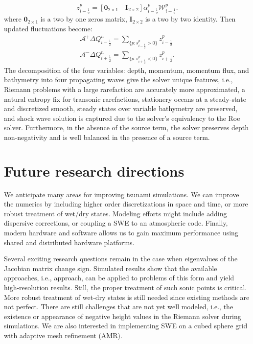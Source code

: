 \documentclass[10pt,a4paper]{article}
\begin{document}
	\begin{equation}
		z_{i-\frac{1}{2}}^{p} = [\mathbf{0}_{2\times1} \quad \mathbf{I}_{2\times2}] \alpha_{i-\frac{1}{2}}^{p} \mathcal{W}_{i-\frac{1}{2}}^{p}.
	\end{equation}
	where $\mathbf{0}_{2\times1}$ is a two by one zeros matrix, $\mathbf{I}_{2\times2}$ is a two by two identity. Then updated fluctuations become:
	\begin{eqnarray}
		\mathcal{A^{+}}\Delta Q_{i-\frac{1}{2}}^{n} = \sum_{\{ p:s_{i-\frac{1}{2}}^{p}>0\}}  z_{i-\frac{1}{2}}^{p}
		\label{p7}\\
		\mathcal{A^{-}}\Delta Q_{i+\frac{1}{2}}^{n} = \sum_{\{ p:s_{i+\frac{1}{2}}^{p}<0\}} z_{i+\frac{1}{2}}^{p}.
		\label{p8}
	\end{eqnarray}
The decomposition of the four variables: depth, momentum, momentum flux, and bathymetry into four propagating waves give the solver unique features, i.e.,  Riemann problems with a large rarefaction are accurately more approximated, a natural entropy fix for transonic rarefactions,  stationery oceans at a steady-state and discretized smooth, steady states over variable bathymetry are preserved, and shock wave solution is captured due to the solver's equivalency to the Roe solver.
	Furthermore, in the absence of the source term, the solver preserves depth non-negativity and is well balanced in the presence of a source term.  
	
	
	\section{ Future research directions}
	
	We anticipate many areas for improving tsunami simulations.  We can improve the numerics by including higher order discretizations in space and time, or more robust treatment of  wet/dry states. Modeling efforts might include adding dispersive corrections, or coupling a SWE to an atmospheric code.   Finally, modern hardware and software allows us to gain maximum performance using shared and distributed hardware  platforms. 
	
	Several exciting research questions remain in the case when eigenvalues of the Jacobian matrix change sign. Simulated results show that the available approaches, i.e.,    \citet{ba-le-mi-ro:2003} approach, can be applied to problems of this form and yield high-resolution results. Still, the proper treatment of such sonic points is critical.
	More robust treatment of wet-dry states is still needed since existing methods are not perfect. There are still challenges that are not yet well modeled, i.e., the existence or appearance of negative height values in the Riemann solver during simulations.
	We are also interested in implementing SWE on a cubed sphere grid with adaptive mesh refinement (AMR).  
	
\end{document}
